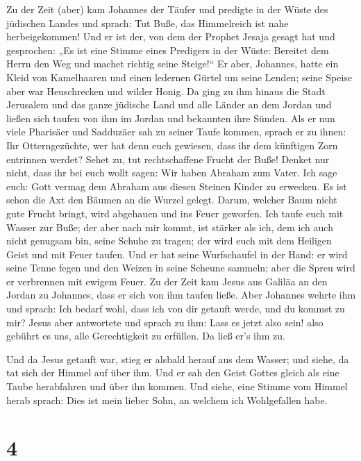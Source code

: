  Zu der Zeit (aber) kam Johannes der Täufer und predigte
in der Wüste des jüdischen Landes  und sprach: Tut Buße,
das Himmelreich ist nahe herbeigekommen!  Und er ist der,
von dem der Prophet Jesaja gesagt hat und gesprochen: „Es ist eine
Stimme eines Predigers in der Wüste: Bereitet dem Herrn den Weg und
machet richtig seine Steige!{}``  Er aber, Johannes, hatte
ein Kleid von Kamelhaaren und einen ledernen Gürtel um seine Lenden;
seine Speise aber war Heuschrecken und wilder Honig.  Da
ging zu ihm hinaus die Stadt Jerusalem und das ganze jüdische Land und
alle Länder an dem Jordan  und ließen sich taufen von ihm
im Jordan und bekannten ihre Sünden.  Als er nun viele
Pharisäer und Sadduzäer sah zu seiner Taufe kommen, sprach er zu ihnen:
Ihr Otterngezüchte, wer hat denn euch gewiesen, dass ihr dem künftigen
Zorn entrinnen werdet?  Sehet zu, tut rechtschaffene
Frucht der Buße!  Denket nur nicht, dass ihr bei euch
wollt sagen: Wir haben Abraham zum Vater. Ich sage euch: Gott vermag dem
Abraham aus diesen Steinen Kinder zu erwecken.  Es ist
schon die Axt den Bäumen an die Wurzel gelegt. Darum, welcher Baum nicht
gute Frucht bringt, wird abgehauen und ins Feuer geworfen.
 Ich taufe euch mit Wasser zur Buße; der aber nach mir
kommt, ist stärker als ich, dem ich auch nicht genugsam bin, seine
Schuhe zu tragen; der wird euch mit dem Heiligen Geist und mit Feuer
taufen.  Und er hat seine Wurfschaufel in der Hand: er
wird seine Tenne fegen und den Weizen in seine Scheune sammeln; aber die
Spreu wird er verbrennen mit ewigem Feuer.  Zu der Zeit
kam Jesus aus Galiläa an den Jordan zu Johannes, dass er sich von ihm
taufen ließe.  Aber Johannes wehrte ihm und sprach: Ich
bedarf wohl, dass ich von dir getauft werde, und du kommst zu mir?
 Jesus aber antwortete und sprach zu ihm: Lass es jetzt
also sein! also gebührt es uns, alle Gerechtigkeit zu erfüllen. Da ließ
er's ihm zu.

 Und da Jesus getauft war, stieg er alsbald herauf aus
dem Wasser; und siehe, da tat sich der Himmel auf über ihm. Und er sah
den Geist Gottes gleich als eine Taube herabfahren und über ihn kommen.
 Und siehe, eine Stimme vom Himmel herab sprach: Dies ist
mein lieber Sohn, an welchem ich Wohlgefallen habe.

\hypertarget{section-3}{%
\section{4}\label{section-3}}

